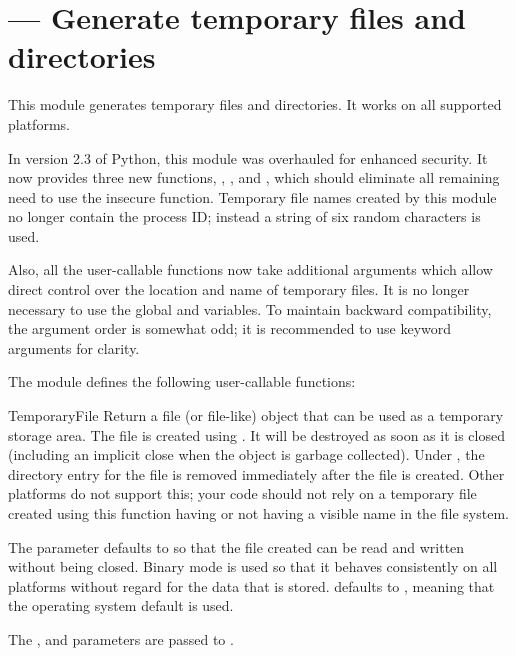\section{ ---
         Generate temporary files and directories}



This module generates temporary files and directories.  It works on
all supported platforms.

In version 2.3 of Python, this module was overhauled for enhanced
security.  It now provides three new functions,
, , and
, which should eliminate all remaining need to use
the insecure  function.  Temporary file names created
by this module no longer contain the process ID; instead a string of
six random characters is used.

Also, all the user-callable functions now take additional arguments
which allow direct control over the location and name of temporary
files.  It is no longer necessary to use the global  and
 variables.  To maintain backward compatibility, the
argument order is somewhat odd; it is recommended to use keyword
arguments for clarity.

The module defines the following user-callable functions:

\begin{funcdesc}{TemporaryFile}{}
Return a file (or file-like) object that can be used as a temporary
storage area.  The file is created using . It will
be destroyed as soon as it is closed (including an implicit close when
the object is garbage collected).  Under \UNIX, the directory entry
for the file is removed immediately after the file is created.  Other
platforms do not support this; your code should not rely on a
temporary file created using this function having or not having a
visible name in the file system.

The  parameter defaults to  so that the file
created can be read and written without being closed.  Binary mode is
used so that it behaves consistently on all platforms without regard
for the data that is stored.   defaults to ,
meaning that the operating system default is used.

The ,  and  parameters are passed to
.
\end{funcdesc}

